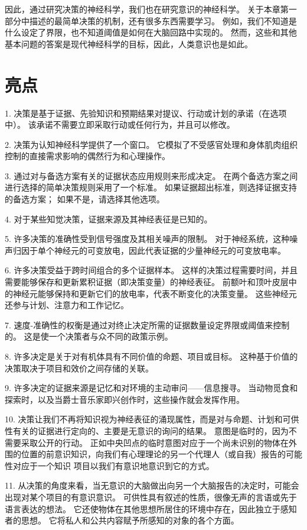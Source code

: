 因此，通过研究决策的神经科学，我们也在研究意识的神经科学。
关于本章第一部分中描述的最简单决策的机制，还有很多东西需要学习。
例如，我们不知道是什么设定了界限，也不知道阈值是如何在大脑回路中实现的。
然而，这些和其他基本问题的答案是现代神经科学的目标，因此，人类意识也是如此。



\section{亮点}

1. 决策是基于证据、先验知识和预期结果对提议、行动或计划的承诺（在选项中）。
该承诺不需要立即采取行动或任何行为，并且可以修改。 


2. 决策为认知神经科学提供了一个窗口。
它模拟了不受感官处理和身体肌肉组织控制的直接需求影响的偶然行为和心理操作。


3. 通过对与备选方案有关的证据状态应用规则来形成决定。
在两个备选方案之间进行选择的简单决策规则采用了一个标准。
如果证据超出标准，则选择证据支持的备选方案；
如果不是，请选择其他选项。


4. 对于某些知觉决策，证据来源及其神经表征是已知的。


5. 许多决策的准确性受到信号强度及其相关噪声的限制。
对于神经系统，这种噪声归因于单个神经元的可变放电，因此代表证据的少量神经元的可变放电率。


6. 许多决策受益于跨时间组合的多个证据样本。
这样的决策过程需要时间，并且需要能够保存和更新累积证据（即决策变量）的神经表征。
前额叶和顶叶皮层中的神经元能够保持和更新它们的放电率，代表不断变化的决策变量。
这些神经元还参与计划、注意力和工作记忆。


7. 速度-准确性的权衡是通过对终止决定所需的证据数量设定界限或阈值来控制的。
这是使一个决策者与众不同的政策示例。


8. 许多决定是关于对有机体具有不同价值的命题、项目或目标。
这种基于价值的决策取决于项目和效价之间存储的关联。 


9. 许多决定的证据来源是记忆和对环境的主动审问——信息搜寻。
当动物觅食和探索时，以及当爵士音乐家即兴创作时，这些操作就会发挥作用。


10. 决策让我们不再将知识视为神经表征的涌现属性，而是对与命题、计划和可供性有关的证据进行定向的、主要是无意识的询问的结果。
意图是临时的，因为不需要采取公开的行动。
正如中央凹点的临时意图对应于一个尚未识别的物体在外围的位置的前意识知识，向我们有心理理论的另一个代理人（或自我）报告的可能性对应于一个知识 项目以我们有意识地意识到它的方式。


11. 从决策的角度来看，当无意识的大脑做出向另一个大脑报告的决定时，可能会出现对某个项目的有意识意识。
可供性具有叙述的性质，很像无声的言语或先于语言表达的想法。
它还使物体在其他思想所居住的环境中存在，因此独立于感知者的思想。
它将私人和公共内容赋予所感知的对象的各个方面。


